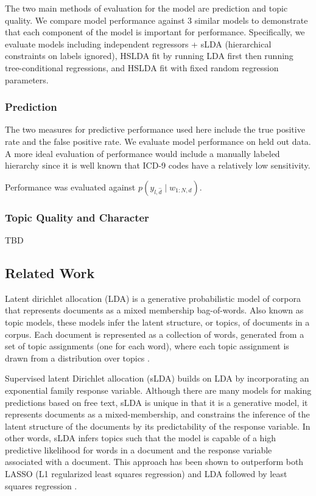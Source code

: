 \documentclass{article}
\begin{document}
The two main methods of evaluation for the model are prediction and
topic quality. We compare model performance against 3 similar models
to demonstrate that each component of the model is important for performance.
Specifically, we evaluate models including independent regressors
+ sLDA (hierarchical constraints on labels ignored), HSLDA fit by
running LDA first then running tree-conditional regressions, and HSLDA
fit with fixed random regression parameters.


\subsubsection{Prediction}

The two measures for predictive performance used here include the
true positive rate and the false positive rate. We evaluate model
performance on held out data. A more ideal evaluation of performance
would include a manually labeled hierarchy since it is well known
that ICD-9 codes have a relatively low sensitivity.

Performance was evaluated against $p\left(y_{l,\hat{d}}\mid w_{1:N,d}\right)$. 


\subsubsection{Topic Quality and Character}

TBD


\subsection{Related Work}

\label{sec:related_work} Latent dirichlet allocation (LDA) is a generative
probabilistic model of corpora that represents documents as a mixed
membership bag-of-words. Also known as topic models, these models
infer the latent structure, or topics, of documents in a corpus. Each
document is represented as a collection of words, generated from a
set of topic assignments (one for each word), where each topic assignment
is drawn from a distribution over topics \citep{Blei2003}.

Supervised latent Dirichlet allocation (sLDA) builds on LDA by incorporating
an exponential family response variable. Although there are many models
for making predictions based on free text, sLDA is unique in that
it is a generative model, it represents documents as a mixed-membership,
and constrains the inference of the latent structure of the documents
by its predictability of the response variable. In other words, sLDA
infers topics such that the model is capable of a high predictive
likelihood for words in a document and the response variable associated
with a document. This approach has been shown to outperform both LASSO
(L1 regularized least squares regression) and LDA followed by least
squares regression \citep{BleiMcAuliffe2008}.
\end{document}

